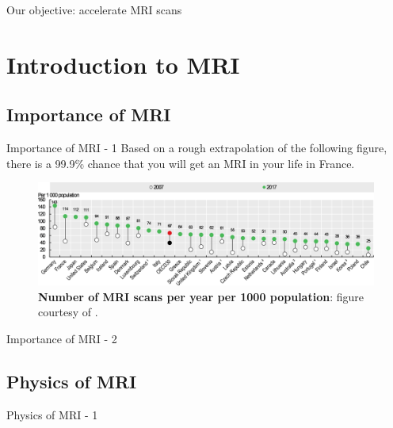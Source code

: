 \documentclass[aspectratio=169,xcolor=dvipsnames]{beamer}
\begin{document}
\begin{frame}{Our objective: accelerate MRI scans}
    \begin{multicols}{2}
    \tableofcontents
    \end{multicols}
\end{frame}

\section{Introduction to MRI}
\subsection{Importance of MRI}
\begin{frame}{Importance of MRI - 1}
    Based on a rough extrapolation of the following figure, there is a 99.9\% chance that you will get an MRI in your life in France.
    \begin{figure}
        \centering
        \includegraphics[width=\textwidth]{Figures/intro_figures/num_mri_scans.png}
        \caption{\label{fig:num-mri-scans} \textbf{Number of MRI scans per year per 1000 population}: figure courtesy of \citet{OECDMRI}.}
    \end{figure}
\end{frame}

\begin{frame}{Importance of MRI - 2}
\end{frame}

\subsection{Physics of MRI}
\begin{frame}{Physics of MRI - 1}
\end{frame}
\end{document}
